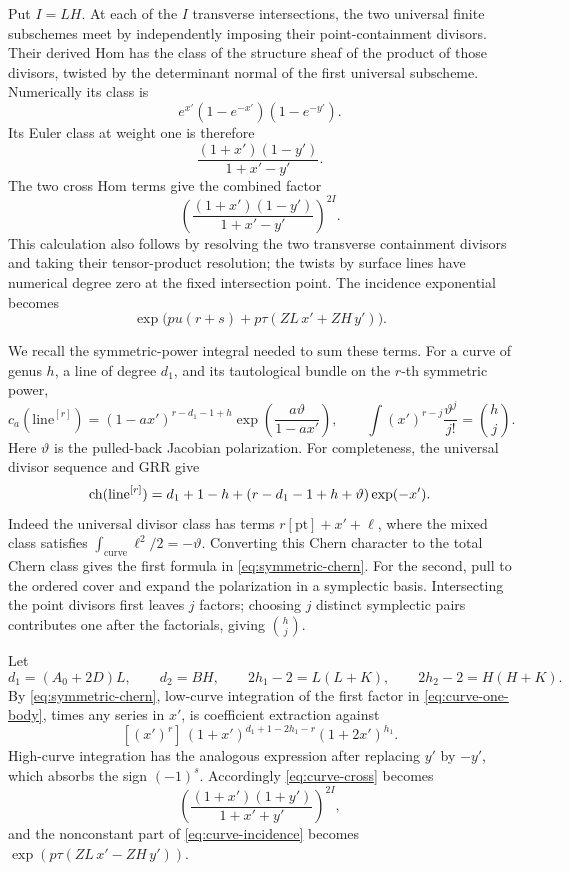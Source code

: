Put \(I=LH\). At each of the \(I\) transverse intersections, the two
universal finite subschemes meet by independently imposing their
point-containment divisors. Their derived Hom has the class of the
structure sheaf of the product of those divisors, twisted by the
determinant normal of the first universal subscheme.
Numerically its class is
\[
 e^{x'}(1-e^{-x'})(1-e^{-y'}).
\]
Its Euler class at weight one is therefore
\[
 \frac{(1+x')(1-y')}{1+x'-y'}.
\]
The two cross Hom terms give the combined factor
\begin{equation}\label{eq:curve-cross}
 \left(\frac{(1+x')(1-y')}{1+x'-y'}\right)^{2I}.
\end{equation}
This calculation also follows by resolving the two transverse
containment divisors and taking their tensor-product resolution;
the twists by surface lines have numerical degree zero at the
fixed intersection point.
The incidence exponential becomes
\begin{equation}\label{eq:curve-incidence}
 \exp\bigl(pu(r+s)+p\tau(ZL\,x'+ZH\,y')\bigr).
\end{equation}

We recall the symmetric-power integral needed to sum these terms.
For a curve of genus \(h\), a line of degree \(d_1\), and its
tautological bundle on the \(r\)-th symmetric power,
\begin{equation}\label{eq:symmetric-chern}
 c_a(\mathrm{line}^{[r]})
 =(1-a x')^{r-d_1-1+h}
 \exp\left(\frac{a\vartheta}{1-a x'}\right),
 \qquad
 \int (x')^{r-j}\frac{\vartheta^j}{j!}=\binom hj.
\end{equation}
Here \(\vartheta\) is the pulled-back Jacobian polarization.
For completeness, the universal divisor sequence and GRR give
\[
 \operatorname{ch}(\mathrm{line}^{[r]})
 =d_1+1-h+
   (r-d_1-1+h+\vartheta)\exp(-x').
\]
Indeed the universal divisor class has terms
\(r[\mathrm{pt}]+x'+\ell\), where the mixed class satisfies
\(\int_{\mathrm{curve}}\ell^2/2=-\vartheta\).
Converting this Chern character to the total Chern class gives the
first formula in \eqref{eq:symmetric-chern}.
For the second, pull to the ordered cover and expand the polarization
in a symplectic basis. Intersecting the point divisors first leaves
\(j\) factors; choosing \(j\) distinct symplectic pairs contributes
one after the factorials, giving \(\binom hj\).

Let
\[
 d_1=(A_0+2D)L,\qquad d_2=BH,\qquad
 2h_1-2=L(L+K),\qquad 2h_2-2=H(H+K).
\]
By \eqref{eq:symmetric-chern}, low-curve integration of the first
factor in \eqref{eq:curve-one-body}, times any series in \(x'\),
is coefficient extraction against
\begin{equation}\label{eq:curve-integration}
 [ (x')^r]\,
 (1+x')^{d_1+1-2h_1-r}(1+2x')^{h_1}.
\end{equation}
High-curve integration has the analogous expression after replacing
\(y'\) by \(-y'\), which absorbs the sign \((-1)^s\).
Accordingly \eqref{eq:curve-cross} becomes
\[
 \left(\frac{(1+x')(1+y')}{1+x'+y'}\right)^{2I},
\]
and the nonconstant part of \eqref{eq:curve-incidence} becomes
\(\exp(p\tau(ZL\,x'-ZH\,y'))\).

